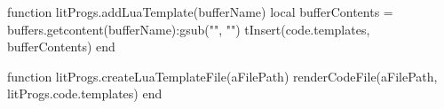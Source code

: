 
\startchapter[title=Lua Templates]

\startMkIVCode




\setuptyping[Template][option=lua]


\let\oldStopLuaTemplate=\stopLuaTemplate
\def\stopLuaTemplate{%
  \oldStopLuaTemplate%
  \directlua{thirddata.literateProgs.addLuaTemplate('_typing_')}}


\def\createTemplateFile[#1]{
  \directlua{thirddata.literateProgs.createLuaTemplateFile('#1')}
}

\stopMkIVCode

\startLuaCode

function litProgs.addLuaTemplate(bufferName)
  local bufferContents = buffers.getcontent(bufferName):gsub("", "\n")
  tInsert(code.templates, bufferContents)
end

function litProgs.createLuaTemplateFile(aFilePath)
  renderCodeFile(aFilePath, litProgs.code.templates)
end

\stopLuaCode

\stopchapter